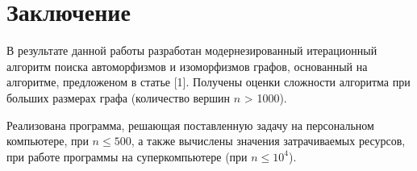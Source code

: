 \section*{Заключение}
\label{sec:Chapter6} 
\large

В результате данной работы разработан модернезированный итерационный алгоритм поиска автоморфизмов и изоморфизмов графов, основанный на алгоритме, предложеном в статье [1]. Получены оценки сложности алгоритма при больших размерах графа (количество вершин $n$ > 1000).

Реализована программа, решающая поставленную задачу на персональном компьютере, при $n \leq  500$, а также вычислены значения затрачиваемых ресурсов, при работе программы на суперкомпьютере (при $n \leq 10^4$).